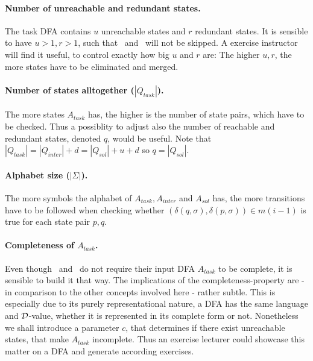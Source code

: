 \paragraph*{Number of unreachable and redundant states.}

The task DFA contains $u$ unreachable states and $r$ redundant states. It is sensible to have $u > 1, r > 1$, such that \RemUnr\ and \RemEq\ will not be skipped. A exercise instructor will find it useful, to control exactly how big $u$ and $r$ are: The higher $u, r$, the more states have to be eliminated and merged.

\paragraph*{Number of states alltogether ($|Q_{task}|$).}

The more states $A_{task}$ has, the higher is the number of state pairs, which have to be checked. Thus a possiblity to adjust also the number of reachable and redundant states, denoted $q$, would be useful. Note that $|Q_{task}| = |Q_{inter}| + d = |Q_{sol}| + u + d$ so $q = |Q_{sol}|$.

\paragraph*{Alphabet size ($|\Sigma|$).}

The more symbols the alphabet of $A_{task}, A_{inter}$ and $A_{sol}$ has, the more transitions have to be followed when checking whether $(\delta(q,\sigma),\delta(p,\sigma))\in m(i-1)$ is true for each state pair $p,q$.

\paragraph*{Completeness of $A_{task}$.}

Even though \CompUnr\ and \RemUnr\ do not require their input DFA $A_{task}$ to be complete, it is sensible to build it that way. The implications of the completeness-property are - in comparison to the other concepts involved here - rather subtle. This is especially due to its purely representational nature, a DFA has the same language and $\mathcal{D}$-value, whether it is represented in its complete form or not. Nonetheless we shall introduce a parameter $c$, that determines if there exist unreachable states, that make $A_{task}$ incomplete. Thus an exercise lecturer could showcase this matter on a DFA and generate according exercises.

